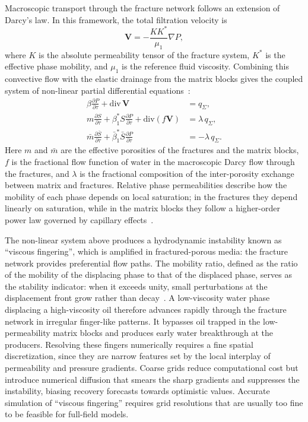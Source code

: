 Macroscopic transport through the fracture network follows an extension of Darcy's law. In this framework, the total filtration velocity is
\begin{equation}
    \mathbf{V} = - \frac{K K^*}{\mu_1} \nabla P,
    \label{eq:darcy_fpor}
\end{equation}
where $K$ is the absolute permeability tensor of the fracture system, $K^*$ is the effective phase mobility, and $\mu_1$ is the reference fluid viscosity. Combining this convective flow with the elastic drainage from the matrix blocks gives the coupled system of non-linear partial differential equations~\cite{textbook_fpor}:
\begin{align}
    \beta \frac{\partial P}{\partial \tau} + \text{div}\,\mathbf{V} &= q_\Sigma, \label{eq:fpor_pressure} \\
    m \frac{\partial S}{\partial \tau} + \beta_1^* S \frac{\partial P}{\partial \tau} + \text{div}(f \mathbf{V}) &= \lambda \, q_\Sigma, \label{eq:fpor_frac_sat} \\
    \bar{m} \frac{\partial \bar{S}}{\partial \tau} + \bar{\beta}_1^* \bar{S} \frac{\partial P}{\partial \tau} &= -\lambda \, q_\Sigma. \label{eq:fpor_block_sat}
\end{align}
Here $m$ and $\bar{m}$ are the effective porosities of the fractures and the matrix blocks, $f$ is the fractional flow function of water in the macroscopic Darcy flow through the fractures, and $\lambda$ is the fractional composition of the inter-porosity exchange between matrix and fractures. Relative phase permeabilities describe how the mobility of each phase depends on local saturation; in the fractures they depend linearly on saturation, while in the matrix blocks they follow a higher-order power law governed by capillary effects~\cite{textbook_fpor}.

The non-linear system above produces a hydrodynamic instability known as \enquote{viscous fingering}, which is amplified in fractured-porous media: the fracture network provides preferential flow paths. The mobility ratio, defined as the ratio of the mobility of the displacing phase to that of the displaced phase, serves as the stability indicator: when it exceeds unity, small perturbations at the displacement front grow rather than decay~\cite{istina_fingering}. A low-viscosity water phase displacing a high-viscosity oil therefore advances rapidly through the fracture network in irregular finger-like patterns. It bypasses oil trapped in the low-permeability matrix blocks and produces early water breakthrough at the producers. Resolving these fingers numerically requires a fine spatial discretization, since they are narrow features set by the local interplay of permeability and pressure gradients. Coarse grids reduce computational cost but introduce numerical diffusion that smears the sharp gradients and suppresses the instability, biasing recovery forecasts towards optimistic values. Accurate simulation of \enquote{viscous fingering} requires grid resolutions that are usually too fine to be feasible for full-field models.




